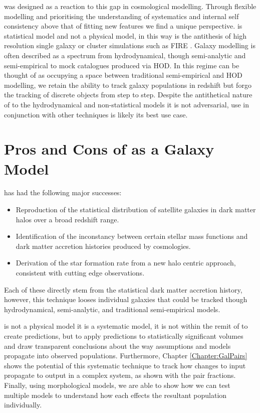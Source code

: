 \steel was designed as a reaction to this gap in cosmological modelling. Through flexible modelling and prioritising the understanding of systematics and internal self consistency above that of fitting new features we find a unique perspective. \steel is statistical model and not a physical model, in this way is the antithesis of high resolution single galaxy or cluster simulations such as FIRE \cite{Hopkins2018FIRE-2Formation}. Galaxy modelling is often described as a spectrum from hydrodynamical, though semi-analytic and semi-empirical to mock catalogues produced via HOD. In this regime \steel can be thought of as occupying a space between traditional semi-empirical and HOD modelling, we retain the ability to track galaxy populations in redshift but forgo the tracking of discrete objects from step to step. Despite the antithetical nature of \steel to the hydrodynamical and non-statistical models it is not adversarial, use in conjunction with other techniques is likely its best use case. 

\section{Pros and Cons of \steel as a Galaxy Model}

\steel has had the following major successes:
\begin{itemize}
    \item Reproduction of the statistical distribution of satellite galaxies in dark matter halos over a broad redshift range.
    \item Identification of the inconstancy between certain stellar mass functions and dark matter accretion histories produced by \LCDM cosmologies.
    \item Derivation of the star formation rate from a new halo centric approach, consistent with cutting edge observations.
\end{itemize}
Each of these directly stem from the statistical dark matter accretion history, however, this technique looses individual galaxies that could be tracked though hydrodynamical, semi-analytic, and traditional semi-empirical models.

\steel is not a physical model it is a systematic model, it is not within the remit of \steel to create predictions, but to apply predictions to statistically significant volumes and draw transparent conclusions about the way assumptions and models propagate into observed populations. Furthermore, Chapter \ref{Chapter:GalPairs} shows the potential of this systematic technique to track how changes to input propagate to output in a complex system, as shown with the pair fractions. Finally, using morphological models, we are able to show how we can test multiple models to understand how each effects the resultant population individually.

